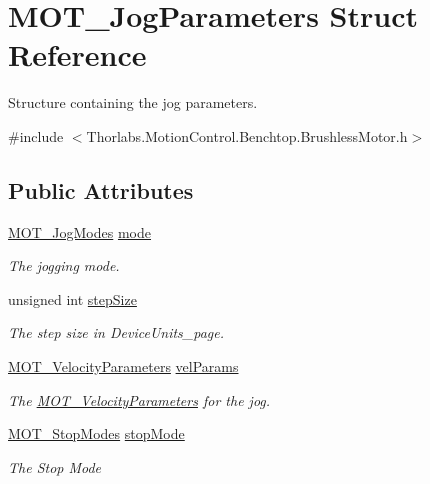 \hypertarget{struct_m_o_t___jog_parameters}{}\section{M\+O\+T\+\_\+\+Jog\+Parameters Struct Reference}
\label{struct_m_o_t___jog_parameters}


Structure containing the jog parameters.  




{\ttfamily \#include $<$Thorlabs.\+Motion\+Control.\+Benchtop.\+Brushless\+Motor.\+h$>$}

\subsection*{Public Attributes}
\begin{DoxyCompactItemize}
\item 
\hyperlink{group___common_ga009eac484778f2873f249c8562d94a93}{M\+O\+T\+\_\+\+Jog\+Modes} \hyperlink{struct_m_o_t___jog_parameters_aa15b08d3db3bc35613c84323e3d09c88}{mode}
\begin{DoxyCompactList}\small\item\em The jogging mode. \end{DoxyCompactList}\item 
unsigned int \hyperlink{struct_m_o_t___jog_parameters_aa9d309a4d04ddbdd7808e80e3e8d2be6}{step\+Size}
\begin{DoxyCompactList}\small\item\em The step size in Device\+Units\+\_\+page. \end{DoxyCompactList}\item 
\hyperlink{struct_m_o_t___velocity_parameters}{M\+O\+T\+\_\+\+Velocity\+Parameters} \hyperlink{struct_m_o_t___jog_parameters_acb940bd7d08f4ef13a1d7657bc980f66}{vel\+Params}
\begin{DoxyCompactList}\small\item\em The \hyperlink{struct_m_o_t___velocity_parameters}{M\+O\+T\+\_\+\+Velocity\+Parameters} for the jog. \end{DoxyCompactList}\item 
\hyperlink{group___common_ga4b1f06d8365231862a18380e278c3c44}{M\+O\+T\+\_\+\+Stop\+Modes} \hyperlink{struct_m_o_t___jog_parameters_ab5411ddac06335df299b4de841a31575}{stop\+Mode}
\begin{DoxyCompactList}\small\item\em The Stop Mode\end{DoxyCompactList}\end{DoxyCompactItemize}



